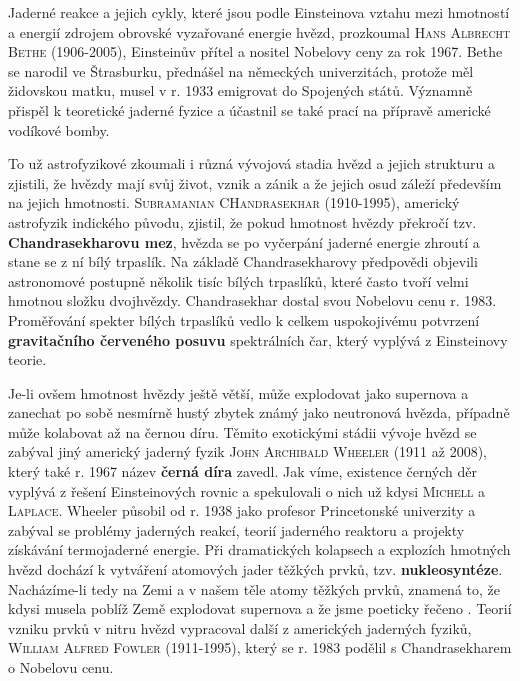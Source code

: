         Jaderné reakce a jejich cykly, které jsou podle Einsteinova vztahu mezi hmotností a energií
        zdrojem obrovské vyzařované energie hvězd, prozkoumal \textsc{Hans Albrecht Bethe}
        (1906-2005), Einsteinův přítel a nositel Nobelovy ceny za rok 1967. Bethe se narodil ve
        Štrasburku, přednášel na německých univerzitách, protože měl židovskou matku, musel v r.
        1933 emigrovat do Spojených států. Významně přispěl k teoretické jaderné fyzice a účastnil
        se také prací na přípravě americké vodíkové bomby.

        To už astrofyzikové zkoumali i různá vývojová stadia hvězd a jejich strukturu a zjistili, že
        hvězdy mají svůj život, vznik a zánik a že jejich osud záleží především na jejich hmotnosti.
        \textsc{Subramanian CHandrasekhar} (1910-1995), americký astrofyzik indického původu,
        zjistil, že pokud hmotnost hvězdy překročí tzv. \textbf{Chandrasekharovu mez}, hvězda se po
        vyčerpání jaderné energie zhroutí a stane se z ní bílý trpaslík. Na základě Chandrasekharovy
        předpovědi objevili astronomové postupně několik tisíc bílých trpaslíků, které často tvoří
        velmi hmotnou složku dvojhvězdy. Chandrasekhar dostal svou Nobelovu cenu r. 1983.
        Proměřování spekter bílých trpaslíků vedlo k celkem uspokojivému potvrzení
        \textbf{gravitačního červeného posuvu} spektrálních čar, který vyplývá z Einsteinovy teorie.

        Je-li ovšem hmotnost hvězdy ještě větší, může explodovat jako supernova a zanechat po sobě
        nesmírně hustý zbytek známý jako neutronová hvězda, případně může kolabovat až na černou
        díru. Těmito exotickými stádii vývoje hvězd se zabýval jiný americký jaderný fyzik
        \textsc{John Archibald Wheeler} (1911 až 2008), který také r. 1967 název \textbf{černá díra}
        zavedl. Jak víme, existence černých děr vyplývá z řešení Einsteinových rovnic a spekulovali
        o nich už kdysi \textsc{Michell} a \textsc{Laplace}. Wheeler působil od r. 1938 jako
        profesor Princetonské univerzity a zabýval se problémy jaderných reakcí, teorií jaderného
        reaktoru a projekty získávání termojaderné energie. Při dramatických kolapsech a explozích
        hmotných hvězd dochází k vytváření atomových jader těžkých prvků, tzv.
        \textbf{nukleosyntéze}. Nacházíme-li tedy na Zemi a v našem těle atomy těžkých prvků,
        znamená to, že kdysi musela poblíž Země explodovat supernova a že jsme poeticky řečeno
        \emph{}. Teorií vzniku prvků v nitru hvězd vypracoval další z
        amerických jaderných fyziků, \textsc{William Alfred Fowler} (1911-1995), který se r. 1983
        podělil s Chandrasekharem o Nobelovu cenu.
        
